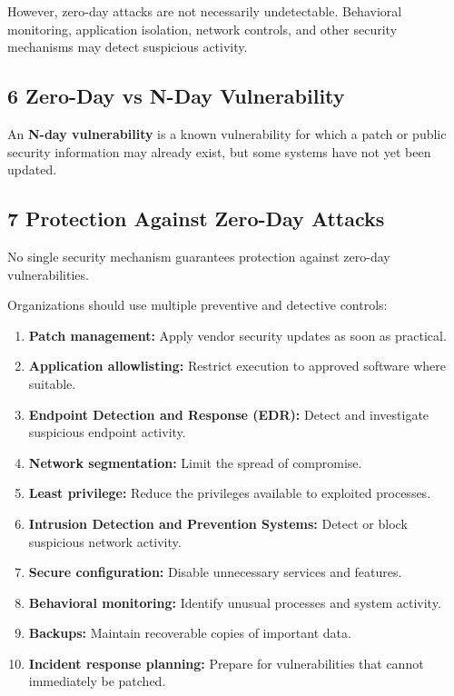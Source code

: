 However, zero-day attacks are not necessarily undetectable. Behavioral monitoring, application isolation, network controls, and other security mechanisms may detect suspicious activity.

\subsection{6 Zero-Day vs N-Day Vulnerability}

An \textbf{N-day vulnerability} is a known vulnerability for which a patch or public security information may already exist, but some systems have not yet been updated.


\subsection{7 Protection Against Zero-Day Attacks}

No single security mechanism guarantees protection against zero-day vulnerabilities.

Organizations should use multiple preventive and detective controls:

\begin{enumerate}
\item \textbf{Patch management:} Apply vendor security updates as soon as practical.
\item \textbf{Application allowlisting:} Restrict execution to approved software where suitable.
\item \textbf{Endpoint Detection and Response (EDR):} Detect and investigate suspicious endpoint activity.
\item \textbf{Network segmentation:} Limit the spread of compromise.
\item \textbf{Least privilege:} Reduce the privileges available to exploited processes.
\item \textbf{Intrusion Detection and Prevention Systems:} Detect or block suspicious network activity.
\item \textbf{Secure configuration:} Disable unnecessary services and features.
\item \textbf{Behavioral monitoring:} Identify unusual processes and system activity.
\item \textbf{Backups:} Maintain recoverable copies of important data.
\item \textbf{Incident response planning:} Prepare for vulnerabilities that cannot immediately be patched.
\end{enumerate}

